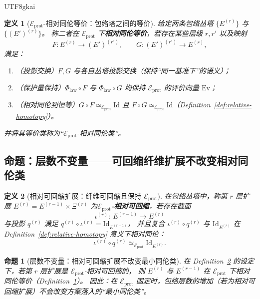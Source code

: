 \documentclass[12pt]{article}
\newtheorem{definition}{定义}[section]
\newtheorem{proposition}{命题}[section]
\begin{document}
\begin{CJK*}{UTF8}{gkai}
\begin{definition}[$\mathcal{E}_{\mathrm{prot}}$-相对同伦等价：包络塔之间的等价]
\label{def:relative-homotopy-equivalence}
给定两条包络丛塔 $\{E^{(r)}\}$ 与 $\{(E')^{(r)}\}$。
称二者在 $\mathcal{E}_{\mathrm{prot}}$ 下\textbf{相对同伦等价}，若存在某些层级 $r,r'$ 以及映射
\[
F:E^{(r)}\to (E')^{(r')},
\qquad
G:(E')^{(r')}\to E^{(r)},
\]
满足：
\begin{enumerate}
  \item（投影交换）$F,G$ 与各自丛塔投影交换（保持“同一基准下”的语义）；
  \item（保护量保持）$\Phi_{\mathrm{law}}\circ F$ 与 $\Phi_{\mathrm{law}}\circ G$ 均保持 $\mathcal{E}_{\mathrm{prot}}$ 的评价向量
    $\mathrm{Ev}$；
  \item（相对同伦到恒等）$G\circ F\simeq_{\mathcal{E}_{\mathrm{prot}}}\mathrm{Id}$ 且 $F\circ G\simeq_{\mathcal{E}_{\mathrm{prot}}}
    \mathrm{Id}$（Definition~\ref{def:relative-homotopy}）。
\end{enumerate}
并将其等价类称为“$\mathcal{E}_{\mathrm{prot}}$-相对同伦类”。
\end{definition}

\subsection{命题：层数不变量——可回缩纤维扩展不改变相对同伦类}

\begin{definition}[相对可回缩扩展：纤维可回缩且保持 $\mathcal{E}_{\mathrm{prot}}$]
\label{def:relative-retractable-extension}
在包络丛塔中，称第 $r$ 层扩展 $E^{(r)}=E^{(r-1)}\times \Xi^{(r)}$ 为\textbf{$\mathcal{E}_{\mathrm{prot}}$-相对可回缩}，若存在截面
\[
\iota^{(r)}:\ E^{(r-1)}\to E^{(r)}
\]
与投影 $q^{(r)}$ 满足 $q^{(r)}\circ \iota^{(r)}=\mathrm{Id}_{E^{(r-1)}}$，
并且复合 $\iota^{(r)}\circ q^{(r)}$ 与 $\mathrm{Id}_{E^{(r)}}$ 在 Definition~\ref{def:relative-homotopy} 意义下相对同伦：
\[
\iota^{(r)}\circ q^{(r)}\simeq_{\mathcal{E}_{\mathrm{prot}}}\mathrm{Id}_{E^{(r)}}.
\]
\end{definition}

\begin{proposition}[层数不变量：相对可回缩扩展不改变最小同伦类]
\label{prop:relative-homotopy-depth-invariant}
在 Definition~\ref{def:relative-retractable-extension} 的设定下，若第 $r$ 层扩展是 $\mathcal{E}_{\mathrm{prot}}$-相对可回缩的，
则 $E^{(r)}$ 与 $E^{(r-1)}$ 在 $\mathcal{E}_{\mathrm{prot}}$ 下相对同伦等价（Definition~\ref{def:relative-homotopy-equivalence}）。
因此：在 $\mathcal{E}_{\mathrm{prot}}$ 固定时，包络层数的增加（若为相对可回缩扩展）不会改变方案落入的“最小同伦类”。
\end{proposition}


\end{CJK*}
\end{document}
